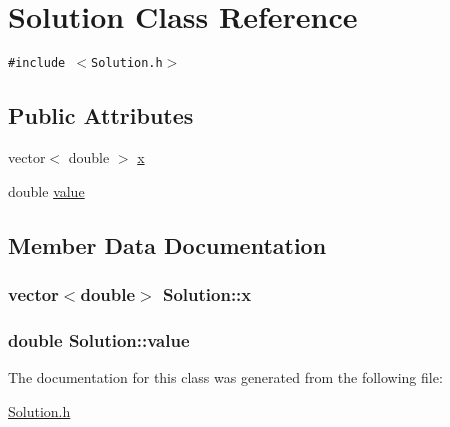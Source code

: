 \hypertarget{classSolution}{
\section{Solution Class Reference}
\label{classSolution}
}
{\tt \#include $<$Solution.h$>$}

\subsection*{Public Attributes}
\begin{CompactItemize}
\item 
vector$<$ double $>$ \hyperlink{classSolution_4b0c127456c4183455b69af7955f15e3}{x}
\item 
double \hyperlink{classSolution_eea6940a1bef4671228f935574883dbc}{value}
\end{CompactItemize}


\subsection{Member Data Documentation}
\hypertarget{classSolution_4b0c127456c4183455b69af7955f15e3}{
\subsubsection{\setlength{\rightskip}{0pt plus 5cm}vector$<$double$>$ {\bf Solution::x}}}
\label{classSolution_4b0c127456c4183455b69af7955f15e3}


\hypertarget{classSolution_eea6940a1bef4671228f935574883dbc}{
\subsubsection{\setlength{\rightskip}{0pt plus 5cm}double {\bf Solution::value}}}
\label{classSolution_eea6940a1bef4671228f935574883dbc}




The documentation for this class was generated from the following file:\begin{CompactItemize}
\item 
\hyperlink{Solution_8h}{Solution.h}\end{CompactItemize}
